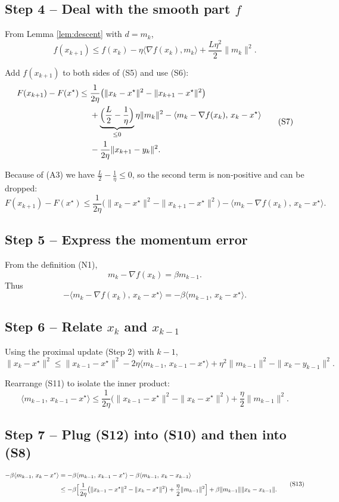 \documentclass{article}
\newcommand{\grad}{\nabla}
\begin{document}
\subsection*{Step 4 – Deal with the smooth part $f$}
From Lemma \ref{lem:descent} with $d=m_k$,
\[
f(x_{k+1})\le f(x_k)-\eta\langle\grad f(x_k),m_k\rangle
+\frac{L\eta^{2}}{2}\|m_k\|^{2}.
\tag{S6}
\]

Add $f(x_{k+1})$ to both sides of (S5) and use (S6):
\[
\begin{aligned}
F(x_{k+1})-F(x^\star)
\le &\; \frac{1}{2\eta}\bigl(\|x_k-x^\star\|^{2}-\|x_{k+1}-x^\star\|^{2}\bigr)\\
&\;+\underbrace{\Bigl(\frac{L}{2}-\frac{1}{\eta}\Bigr)}_{\le0}
\eta\|m_k\|^{2}
-\langle m_k-\grad f(x_k),\,x_k-x^\star\rangle\\
&\;-\frac{1}{2\eta}\|x_{k+1}-y_k\|^{2}.
\end{aligned}
\tag{S7}
\]

Because of (A3) we have $\frac{L}{2}-\frac{1}{\eta}\le0$, so the second term is non‑positive and can be dropped:
\[
F(x_{k+1})-F(x^\star)
\le \frac{1}{2\eta}\bigl(\|x_k-x^\star\|^{2}-\|x_{k+1}-x^\star\|^{2}\bigr)
-\langle m_k-\grad f(x_k),\,x_k-x^\star\rangle .
\tag{S8}
\]

\subsection*{Step 5 – Express the momentum error}
From the definition (N1),
\[
m_k-\grad f(x_k)=\beta m_{k-1}.
\tag{S9}
\]
Thus
\[
-\langle m_k-\grad f(x_k),\,x_k-x^\star\rangle
= -\beta\langle m_{k-1},\,x_k-x^\star\rangle .
\tag{S10}
\]

\subsection*{Step 6 – Relate $x_k$ and $x_{k-1}$}
Using the proximal update (Step 2) with $k-1$,
\[
\|x_k-x^\star\|^{2}
\le \|x_{k-1}-x^\star\|^{2}
-2\eta\langle m_{k-1},\,x_{k-1}-x^\star\rangle
+\eta^{2}\|m_{k-1}\|^{2}
-\|x_k-y_{k-1}\|^{2}.
\tag{S11}
\]

Rearrange (S11) to isolate the inner product:
\[
\langle m_{k-1},\,x_{k-1}-x^\star\rangle
\le \frac{1}{2\eta}\bigl(\|x_{k-1}-x^\star\|^{2}-\|x_k-x^\star\|^{2}\bigr)
+\frac{\eta}{2}\|m_{k-1}\|^{2}.
\tag{S12}
\]

\subsection*{Step 7 – Plug (S12) into (S10) and then into (S8)}
\[
\begin{aligned}
-\beta\langle m_{k-1},\,x_k-x^\star\rangle
&= -\beta\langle m_{k-1},\,x_{k-1}-x^\star\rangle
-\beta\langle m_{k-1},\,x_k-x_{k-1}\rangle\\[2pt]
&\le -\beta\Bigl[\frac{1}{2\eta}\bigl(\|x_{k-1}-x^\star\|^{2}-\|x_k-x^\star\|^{2}\bigr)
+\frac{\eta}{2}\|m_{k-1}\|^{2}\Bigr]
+\beta\|m_{k-1}\|\|x_k-x_{k-1}\|.
\end{aligned}
\tag{S13}
\]
\end{document}
